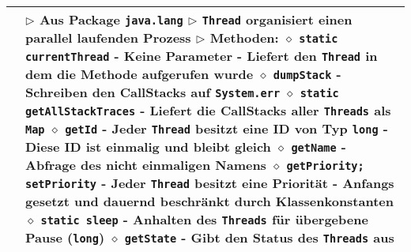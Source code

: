 \begin{longtable}{ | p{} p{} | }
	\makecell[l]{Klasse Thread} & \makecell[l]{
	$\triangleright$ Aus Package \texttt{java.lang} \\
	$\triangleright$ \texttt{Thread} organisiert einen parallel laufenden Prozess \\
	$\triangleright$ Methoden: \\
	\hspace{0.4cm} $\diamond$ \texttt{static currentThread} \\
	\hspace{0.6cm} - Keine Parameter \\
	\hspace{0.6cm} - Liefert den \texttt{Thread} in dem die Methode aufgerufen wurde \\
	\hspace{0.4cm} $\diamond$ \texttt{dumpStack} \\
	\hspace{0.6cm} - Schreiben den CallStacks auf \texttt{System.err} \\
	\hspace{0.4cm} $\diamond$ \texttt{static getAllStackTraces} \\
	\hspace{0.6cm} - Liefert die CallStacks aller \texttt{Threads} als \texttt{Map}	\\
	\hspace{0.4cm} $\diamond$ \texttt{getId} \\
	\hspace{0.6cm} - Jeder \texttt{Thread} besitzt eine ID von Typ \texttt{long} \\
	\hspace{0.6cm} - Diese ID ist einmalig und bleibt gleich \\
	\hspace{0.4cm} $\diamond$ \texttt{getName} \\
	\hspace{0.6cm} - Abfrage des nicht einmaligen Namens \\
	\hspace{0.4cm} $\diamond$ \texttt{getPriority; setPriority} \\
	\hspace{0.6cm} - Jeder \texttt{Thread} besitzt eine Priorität \\
	\hspace{0.6cm} - Anfangs gesetzt und dauernd beschränkt durch Klassenkonstanten \\
	\hspace{0.4cm} $\diamond$ \texttt{static sleep} \\
	\hspace{0.6cm} - Anhalten des \texttt{Threads} für übergebene Pause (\texttt{long}) \\
	\hspace{0.4cm} $\diamond$ \texttt{getState} \\
	\hspace{0.6cm} - Gibt den Status des \texttt{Threads} aus \\
	 } \\ \hline


\end{longtable}
